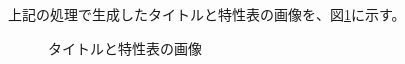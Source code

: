 上記の処理で生成したタイトルと特性表の画像を、図\ref{fig:toku_gazou}に示す。
% 	
\begin{figure}[t]
    \centering
    \caption{タイトルと特性表の画像}
	\label{fig:toku_gazou}
\end{figure}

